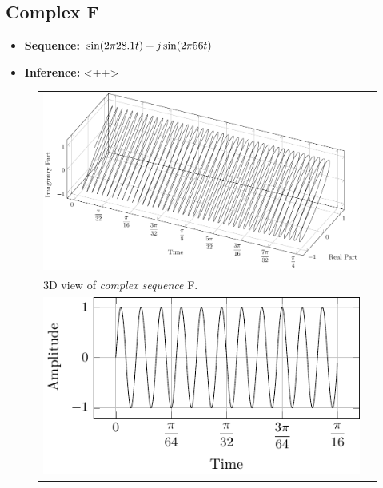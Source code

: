\documentclass[../../course]{subfiles}
\begin{document}
\subsection{Complex F}

\begin{itemize} [label=]

    \item \textbf{Sequence:} $\sin(2 \pi 28.1 t) + j \sin(2 \pi 56 t)$

    \item \textbf{Inference:} <++>

\end{itemize}

\begin{figure} [H]

    \renewcommand{\arraystretch}{0.75}
    \centering
    \begin{NiceTabularX} {\textwidth} {
            *{2}{>{\centering\arraybackslash}X}
        }

         {
             {
                \includegraphics[height = \textheight] {tikzpics/plotComplexF.pdf}
            }
        }

        &
        \\

         {
            \vbox{
                 {3D view of \emph{complex sequence} F.}
                \label{plt:cmplxF}
            }
        }

        &
        \\

         {
             {
                \includegraphics[height = \textheight] {tikzpics/plotShortX2.pdf}
            }
        }


\end{NiceTabularX}
\end{figure}
\end{document}

